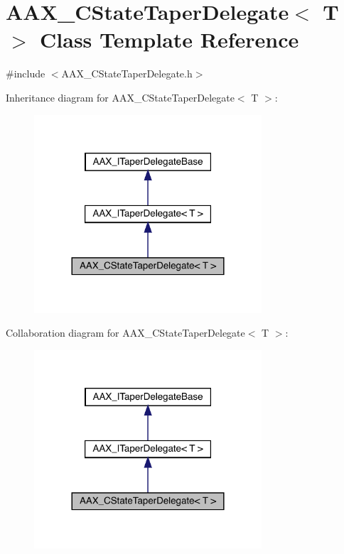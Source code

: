 \hypertarget{a01569}{}\section{A\+A\+X\+\_\+\+C\+State\+Taper\+Delegate$<$ T $>$ Class Template Reference}
\label{a01569}


{\ttfamily \#include $<$A\+A\+X\+\_\+\+C\+State\+Taper\+Delegate.\+h$>$}



Inheritance diagram for A\+A\+X\+\_\+\+C\+State\+Taper\+Delegate$<$ T $>$\+:
\nopagebreak
\begin{figure}[H]
\begin{center}
\leavevmode
\includegraphics[width=240pt]{a01568}
\end{center}
\end{figure}


Collaboration diagram for A\+A\+X\+\_\+\+C\+State\+Taper\+Delegate$<$ T $>$\+:
\nopagebreak
\begin{figure}[H]
\begin{center}
\leavevmode
\includegraphics[width=240pt]{a01567}
\end{center}
\end{figure}


